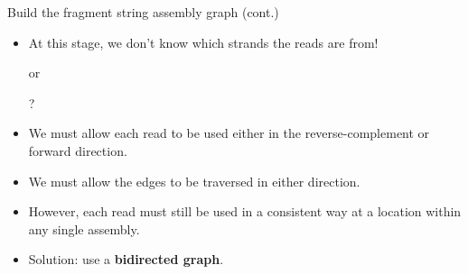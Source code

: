 \documentclass[xcolor=dvipsnames]{beamer}
\newcommand{\ReadArrowType}{latex}
\begin{document}
\begin{frame}{Build the fragment string assembly graph (cont.)}
    \begin{itemize}
        \item At this stage, we don't know which strands the reads are from!

        \begin{center}
            \hspace{5mm}or\hspace{5mm}
            \hspace{5mm} ?
        \end{center}

        \item We must allow each read to be used either in the
        reverse-complement or forward direction.
        \item We must allow the edges to be traversed in either direction.
        \item However, each read must still be used in a consistent way
        at a location within any single assembly.
        \item Solution: use a {\bf bidirected graph}.
    \end{itemize}
    \begin{center}
    \end{center}
\end{frame}
\end{document}
